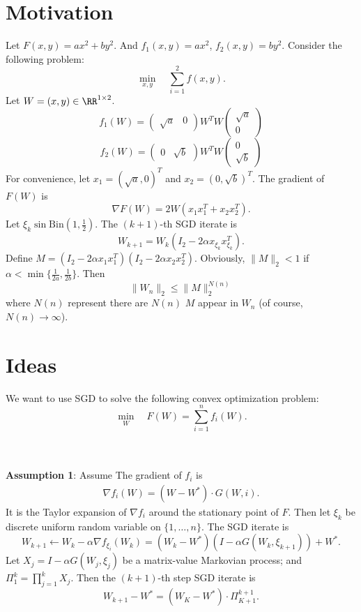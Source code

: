 \section*{Motivation}
Let $F(x,y) = ax^2 + by^2$. And $f_1(x,y) = ax^2$, $f_2(x,y) = by^2$. Consider the following problem:
$$\min_{x,y} \quad \sum_{i=1}^2 f(x,y).$$
Let $W = (x, y) \in \RR^{ 1\times 2 }$. 
$$f_1(W) =  \begin{pmatrix}
\sqrt{a} & 0
\end{pmatrix} W^T W \begin{pmatrix}
\sqrt{a} \\ 
0
\end{pmatrix}$$
$$f_2(W) =  \begin{pmatrix}
0 & \sqrt{b}
\end{pmatrix} W^T W \begin{pmatrix}
0 \\ 
\sqrt{b}
\end{pmatrix}$$
For convenience, let $x_1 = (\sqrt{a}, 0)^T$ and $x_2 = (0, \sqrt{b} )^T$. The gradient of $F(W)$ is 
$$\nabla F(W) = 2W ( x_1 x_1^T + x_2 x_2^T ).$$
Let $\xi_k \sin \mathrm{Bin}(1, \frac{1}{2})$. The $(k+1)$-th SGD iterate is 
$$W_{k+1} = W_k ({ I_2 - 2\alpha   x_{\xi_k} x_{\xi_k}^T} ).$$ 
Define $M = ({ I_2 - 2\alpha   x_{1} x_{1}^T} )({ I_2 - 2\alpha   x_{2} x_{2}^T} )$. Obviously, $\|M\|_2 < 1$ if $\alpha < \min\{ \frac{1}{2a}, \frac{1}{2b} \}$. Then 
$$\| W_n \|_2 \leq \| M \|_2^{N(n)}   $$
where $N(n)$ represent there are $N(n)$ $M$ appear in $W_n$ (of course, $N(n) \to \infty$). 
\section*{Ideas}
We want to use SGD to solve the following convex optimization problem:
$$\min_{W} \quad F(W) = \sum_{i=1}^n f_i(W).$$ \

~\\

\noindent
\textbf{Assumption 1}: Assume The gradient of $f_i$ is 
\begin{align*}
	\nabla f_i(W) = (W - W^\ast)\cdot G(W, i).  
\end{align*} 
It is the Taylor expansion of $\nabla f_i$ around the stationary point of $F$. Then let $\xi_k$ be discrete uniform random variable on $\{1,\dots, n\}$. The SGD iterate is
$$W_{k+1} \leftarrow W_k - \alpha \nabla f_{\xi_i}(W_k) = ( W_k - W^\ast) ( I -   \alpha G(W_k, \xi_{k+1}) ) + W^\ast.$$
Let $X_j = I - \alpha G(W_j, \xi_j)$ be a matrix-value Markovian process; and $\Pi^k_1 = \prod_{j=1}^k X_j$. Then the $(k+1)$-th step SGD iterate is 
$$W_{k+1}- W^\ast = ( W_K-W^\ast) \cdot \Pi^{k+1}_{K+1} .$$ 


